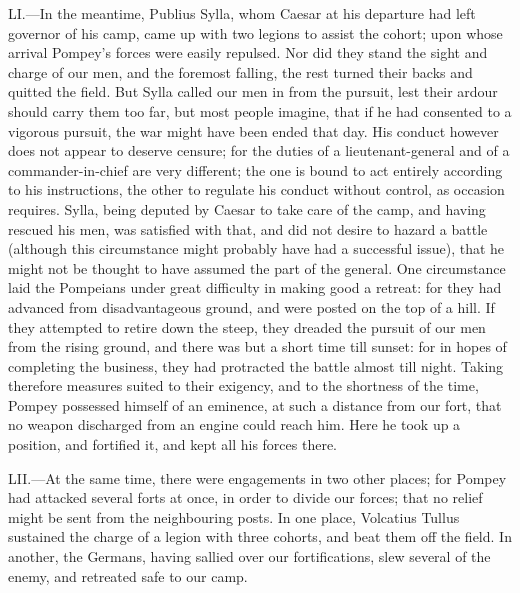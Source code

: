 LI.—In the meantime, Publius Sylla, whom Caesar at his departure had
left governor of his camp, came up with two legions to assist the
cohort; upon whose arrival Pompey's forces were easily repulsed. Nor did
they stand the sight and charge of our men, and the foremost falling,
the rest turned their backs and quitted the field. But Sylla called our
men in from the pursuit, lest their ardour should carry them too far,
but most people imagine, that if he had consented to a vigorous pursuit,
the war might have been ended that day. His conduct however does not
appear to deserve censure; for the duties of a lieutenant-general and of
a commander-in-chief are very different; the one is bound to act
entirely according to his instructions, the other to regulate his
conduct without control, as occasion requires. Sylla, being deputed by
Caesar to take care of the camp, and having rescued his men, was
satisfied with that, and did not desire to hazard a battle (although
this circumstance might probably have had a successful issue), that he
might not be thought to have assumed the part of the general. One
circumstance laid the Pompeians under great difficulty in making good a
retreat: for they had advanced from disadvantageous ground, and were
posted on the top of a hill. If they attempted to retire down the steep,
they dreaded the pursuit of our men from the rising ground, and there
was but a short time till sunset: for in hopes of completing the
business, they had protracted the battle almost till night. Taking
therefore measures suited to their exigency, and to the shortness of the
time, Pompey possessed himself of an eminence, at such a distance from
our fort, that no weapon discharged from an engine could reach him. Here
he took up a position, and fortified it, and kept all his forces there.

LII.—At the same time, there were engagements in two other places; for
Pompey had attacked several forts at once, in order to divide our
forces; that no relief might be sent from the neighbouring posts. In one
place, Volcatius Tullus sustained the charge of a legion with three
cohorts, and beat them off the field. In another, the Germans, having
sallied over our fortifications, slew several of the enemy, and
retreated safe to our camp.

